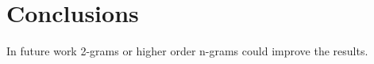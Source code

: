 \chapter{Conclusions}
\label{chapter:conclusions}

In future work 2-grams or higher order n-grams could improve the 
results.

